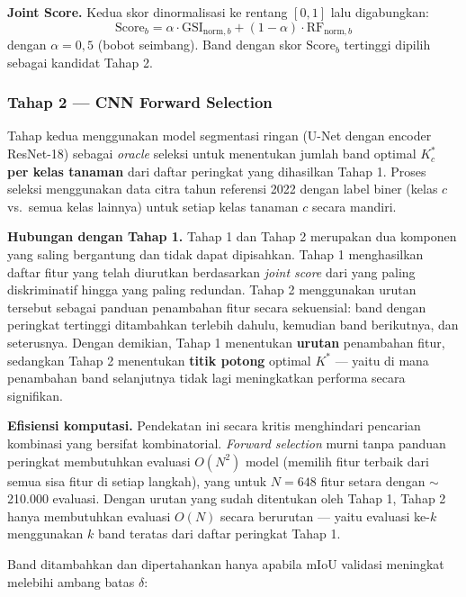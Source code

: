 \textbf{Joint Score.}
Kedua skor dinormalisasi ke rentang $[0,1]$ lalu digabungkan:
\begin{equation}
    \text{Score}_b = \alpha \cdot \text{GSI}_{\text{norm},b} + (1 - \alpha) \cdot \text{RF}_{\text{norm},b}
\end{equation}
dengan $\alpha = 0{,}5$ (bobot seimbang). Band dengan skor $\text{Score}_b$ tertinggi dipilih sebagai kandidat Tahap 2.

\subsubsection{Tahap 2 — CNN Forward Selection}

Tahap kedua menggunakan model segmentasi ringan (U-Net dengan encoder ResNet-18) sebagai \textit{oracle} seleksi untuk menentukan jumlah band optimal $K^*_c$ \textbf{per kelas tanaman} dari daftar peringkat yang dihasilkan Tahap 1. Proses seleksi menggunakan data citra tahun referensi 2022 dengan label biner (kelas $c$ vs.\ semua kelas lainnya) untuk setiap kelas tanaman $c$ secara mandiri.

\textbf{Hubungan dengan Tahap 1.}
Tahap 1 dan Tahap 2 merupakan dua komponen yang saling bergantung dan tidak dapat dipisahkan.
Tahap 1 menghasilkan daftar fitur yang telah diurutkan berdasarkan \textit{joint score} dari yang paling diskriminatif hingga yang paling redundan.
Tahap 2 menggunakan urutan tersebut sebagai panduan penambahan fitur secara sekuensial: band dengan peringkat tertinggi ditambahkan terlebih dahulu, kemudian band berikutnya, dan seterusnya.
Dengan demikian, Tahap 1 menentukan \textbf{urutan} penambahan fitur, sedangkan Tahap 2 menentukan \textbf{titik potong} optimal $K^*$ — yaitu di mana penambahan band selanjutnya tidak lagi meningkatkan performa secara signifikan.

\textbf{Efisiensi komputasi.}
Pendekatan ini secara kritis menghindari pencarian kombinasi yang bersifat kombinatorial.
\textit{Forward selection} murni tanpa panduan peringkat membutuhkan evaluasi $O(N^2)$ model (memilih fitur terbaik dari semua sisa fitur di setiap langkah), yang untuk $N = 648$ fitur setara dengan $\sim$210.000 evaluasi.
Dengan urutan yang sudah ditentukan oleh Tahap 1, Tahap 2 hanya membutuhkan evaluasi $O(N)$ secara berurutan — yaitu evaluasi ke-$k$ menggunakan $k$ band teratas dari daftar peringkat Tahap 1.

Band ditambahkan dan dipertahankan hanya apabila mIoU validasi meningkat melebihi ambang batas $\delta$:

